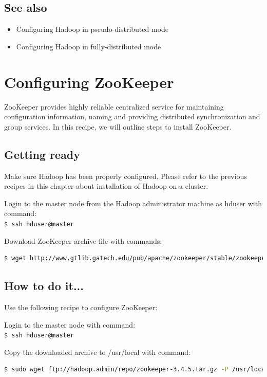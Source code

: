 \subsection*{See also}
\begin{itemize}
\item Configuring Hadoop in pseudo-distributed mode
\item Configuring Hadoop in fully-distributed mode
\end{itemize}

\section{Configuring ZooKeeper}
ZooKeeper provides highly reliable centralized service for maintaining configuration information, naming and providing distributed synchronization and group services. In this recipe, we will outline steps to install ZooKeeper.

\subsection*{Getting ready}
Make sure Hadoop has been properly configured. Please refer to the previous recipes in this chapter about installation of Hadoop on a cluster.

Login to the master node from the Hadoop administrator machine as hduser with command: \\
\verb|$ ssh hduser@master|

Download ZooKeeper archive file with commands:
\lstset{style=bashstyle}
\begin{lstlisting}[language=bash]
$ wget http://www.gtlib.gatech.edu/pub/apache/zookeeper/stable/zookeeper-3.4.5.tar.gz -P ~/repo
\end{lstlisting}

\subsection*{How to do it...}
Use the following recipe to configure ZooKeeper:

Login to the master node with command: \\
\verb|$ ssh hduser@master|

Copy the downloaded archive to /usr/local with command: 
\lstset{style=bashstyle}
\begin{lstlisting}[language=bash]
$ sudo wget ftp://hadoop.admin/repo/zookeeper-3.4.5.tar.gz -P /usr/local
\end{lstlisting}

